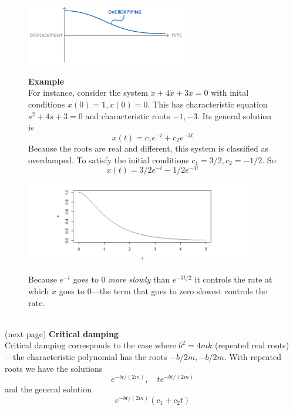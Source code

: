 \documentclass{report}
\begin{document}
\begin{figure}[h]
\begin{center}
\includegraphics[width=7cm]{27}\\
\end{center}
\textbf{Example}\\
For instance, consider the system $\ddot{x}+4\dot{x}+3x=0$ with inital conditions $x(0)=1,\dot{x}(0)=0$. This has
characteristic equation $s^2+4s+3=0$ and characteristic roots $-1,-3$. Its general solution is
\begin{equation*}
x(t)=c_1e^{-t}+c_2e^{-3t}
\end{equation*}
Because the roots are real and different, this system is classified as overdamped. To satisfy the initial conditions
$c_1=3/2,c_2=-1/2$. So 
\begin{equation*}
x(t)=3/2e^{-t}-1/2e^{-3t}
\end{equation*}
\begin{center}
\includegraphics[width=10cm]{28}\\
\end{center}
Because $e^{-t}$ goes to 0 \textit{more slowly} than $e^{-3t/2}$ it controls the rate at which
$x$ goes to 0---the term that goes to zero slowest controls the rate.
\end{figure}\\
(next page)
\newpage
\noindent\textbf{Critical damping}\\
Critical damping corresponds to the case where $b^2=4mk$ (repeated real roots)\\---the characteristic polynomial 
has the roots $-b/2m,-b/2m$.
With repeated roots we have the solutions
\begin{equation*}
e^{-bt/(2m)},\quad te^{-bt/(2m)}
\end{equation*}
and the general solution
\begin{equation*}
e^{-bt/(2m)}(c_1+c_2t)
\end{equation*}
\end{document}
